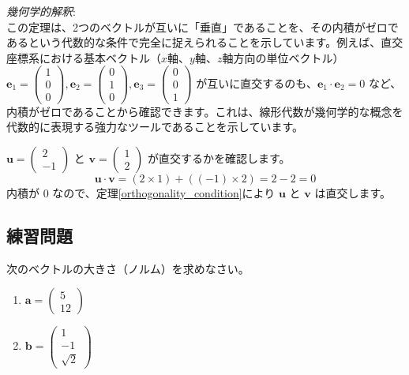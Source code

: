 \emph{幾何学的解釈}:\\
この定理は、2つのベクトルが互いに「垂直」であることを、その内積がゼロであるという代数的な条件で完全に捉えられることを示しています。例えば、直交座標系における基本ベクトル（$x$軸、$y$軸、$z$軸方向の単位ベクトル）$\bm{e}_1 = \begin{pmatrix} 1 \\ 0 \\ 0 \end{pmatrix}, \bm{e}_2 = \begin{pmatrix} 0 \\ 1 \\ 0 \end{pmatrix}, \bm{e}_3 = \begin{pmatrix} 0 \\ 0 \\ 1 \end{pmatrix}$ が互いに直交するのも、$\bm{e}_1 \cdot \bm{e}_2 = 0$ など、内積がゼロであることから確認できます。これは、線形代数が幾何学的な概念を代数的に表現する強力なツールであることを示しています。

\begin{ex}
$\bm{u} = \begin{pmatrix} 2 \\ -1 \end{pmatrix}$ と $\bm{v} = \begin{pmatrix} 1 \\ 2 \end{pmatrix}$ が直交するかを確認します。
\[\bm{u} \cdot \bm{v} = (2 \times 1) + ((-1) \times 2) = 2 - 2 = 0\]
内積が $0$ なので、定理\ref{orthogonality_condition}により $\bm{u}$ と $\bm{v}$ は直交します。
\end{ex}

\subsection{練習問題}

\begin{quiz}
次のベクトルの大きさ（ノルム）を求めなさい。
\begin{enumerate}
\item $\bm{a} = \begin{pmatrix} 5 \\ 12 \end{pmatrix}$
\item $\bm{b} = \begin{pmatrix} 1 \\ -1 \\ \sqrt{2} \end{pmatrix}$
\end{enumerate}
\end{quiz}

